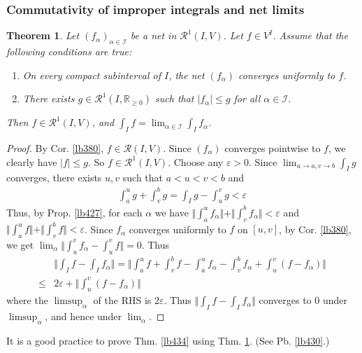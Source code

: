 \documentclass[12pt,b5paper,notitlepage]{article}
\theoremstyle{definition}
\theoremstyle{plain}
\newtheorem{thm}[df]{Theorem}
\newcommand{\scr}{\mathscr}
\newcommand{\Rbb}{\mathbb R}
\newcommand{\dps}{\displaystyle}
\newcommand{\eps}{\varepsilon}
\numberwithin{equation}{section}
\begin{document}
\subsubsection{Commutativity of improper integrals and net limits}



\begin{thm}\label{lb428}
Let $(f_\alpha)_{\alpha\in\scr I}$ be a net in $\scr R^1(I,V)$. Let $f\in V^I$. Assume that the following conditions are true:
\begin{enumerate}[label=(\arabic*)]
\item On every compact subinterval of $I$, the net $(f_\alpha)$ converges uniformly to $f$.
\item There exists $g\in\scr R^1(I,\Rbb_{\geq0})$ such that $|f_\alpha|\leq g$ for all $\alpha\in\scr I$.
\end{enumerate}
Then $f\in\scr R^1(I,V)$, and $\dps\int_If=\lim_{\alpha\in\scr I}\int_If_\alpha$.
\end{thm}


\begin{proof}
By Cor. \ref{lb380}, $f\in\scr R(I,V)$. Since $(f_\alpha)$ converges pointwise to $f$, we clearly have $|f|\leq g$. So $f\in\scr R^1(I,V)$.  Choose any $\eps>0$. Since $\lim_{u\rightarrow a,v\rightarrow b}\int_Ig$ converges, there exists $u,v$ such that $a<u<v<b$ and
\begin{align*}
\int_a^ug+\int_v^bg=\int_Ig-\int_u^v g<\eps
\end{align*}
Thus, by Prop. \ref{lb427}, for each $\alpha$ we have $\Vert\int_a^uf_\alpha\Vert+\Vert\int_v^bf_\alpha\Vert<\eps$ and $\Vert\int_a^uf\Vert+\Vert\int_v^bf\Vert<\eps$. Since $f_\alpha$ converges uniformly to $f$ on $[u,v]$, by Cor. \ref{lb380}, we get $\lim_\alpha\Vert \int_u^vf_\alpha-\int_u^vf\Vert=0$. Thus
\begin{align*}
&\Big\Vert \int_If-\int_If_\alpha\Big\Vert=\Big\Vert \int_a^uf+\int_v^b f-\int_a^u f_\alpha-\int_v^b f_\alpha+\int_u^v(f-f_\alpha)\Big\Vert\\
\leq&2\eps+\Big\Vert\int_u^v(f-f_\alpha)\Big\Vert
\end{align*}
where the $\limsup_\alpha$ of the RHS is $2\eps$. Thus $\Vert\int_If-\int_If_\alpha\Vert$ converges to $0$ under $\limsup_\alpha$, and hence under $\lim_\alpha$.
\end{proof}

It is a good practice to prove Thm. \ref{lb434} using Thm. \ref{lb428}. (See Pb. \ref{lb430}.)
\end{document}
